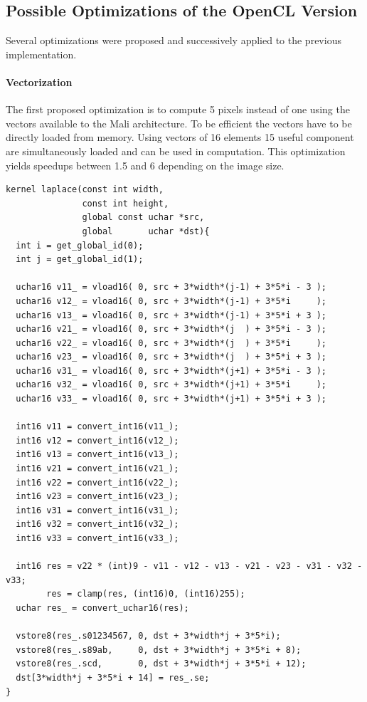 \documentclass[11pt, a4paper, twoside]{montblanc}
\begin{document}
\subsection{Possible Optimizations of the OpenCL Version}

Several optimizations were proposed and successively applied to the previous
implementation.

\paragraph{Vectorization}
The first proposed optimization is to compute 5 pixels instead of one using the
vectors available to the Mali architecture. To be efficient the vectors have to
be directly loaded from memory. Using vectors of 16 elements 15 useful component
are simultaneously loaded and can be used in computation. This optimization
yields speedups between 1.5 and 6 depending on the image size.

\begin{lstlisting}
kernel laplace(const int width,
               const int height,
               global const uchar *src,
               global       uchar *dst){
  int i = get_global_id(0);
  int j = get_global_id(1);

  uchar16 v11_ = vload16( 0, src + 3*width*(j-1) + 3*5*i - 3 );
  uchar16 v12_ = vload16( 0, src + 3*width*(j-1) + 3*5*i     );
  uchar16 v13_ = vload16( 0, src + 3*width*(j-1) + 3*5*i + 3 );
  uchar16 v21_ = vload16( 0, src + 3*width*(j  ) + 3*5*i - 3 );
  uchar16 v22_ = vload16( 0, src + 3*width*(j  ) + 3*5*i     );
  uchar16 v23_ = vload16( 0, src + 3*width*(j  ) + 3*5*i + 3 );
  uchar16 v31_ = vload16( 0, src + 3*width*(j+1) + 3*5*i - 3 );
  uchar16 v32_ = vload16( 0, src + 3*width*(j+1) + 3*5*i     );
  uchar16 v33_ = vload16( 0, src + 3*width*(j+1) + 3*5*i + 3 );

  int16 v11 = convert_int16(v11_);
  int16 v12 = convert_int16(v12_);
  int16 v13 = convert_int16(v13_);
  int16 v21 = convert_int16(v21_);
  int16 v22 = convert_int16(v22_);
  int16 v23 = convert_int16(v23_);
  int16 v31 = convert_int16(v31_);
  int16 v32 = convert_int16(v32_);
  int16 v33 = convert_int16(v33_);

  int16 res = v22 * (int)9 - v11 - v12 - v13 - v21 - v23 - v31 - v32 - v33;
        res = clamp(res, (int16)0, (int16)255);
  uchar res_ = convert_uchar16(res);

  vstore8(res_.s01234567, 0, dst + 3*width*j + 3*5*i);
  vstore8(res_.s89ab,     0, dst + 3*width*j + 3*5*i + 8);
  vstore8(res_.scd,       0, dst + 3*width*j + 3*5*i + 12);
  dst[3*width*j + 3*5*i + 14] = res_.se;
}
\end{lstlisting}
\end{document}

